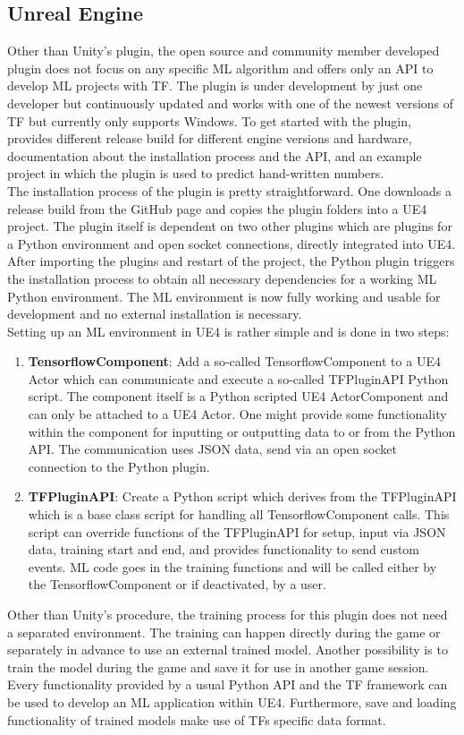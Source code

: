 \documentclass[MGS,Master,english]{twbook}%
\begin{document}
\subsection{Unreal Engine}
Other than Unity’s plugin, the open source and community member developed plugin does not focus on any specific ML algorithm and offers only an API to develop ML projects with \ac{TF}. The plugin is under development by just one developer but continuously updated and works with one of the newest versions of \ac{TF} but currently only supports Windows. To get started with the plugin, \citep{ue4::tensorFlowPlugin} provides different release build for different engine versions and hardware, documentation about the installation process and the API, and an example project in which the plugin is used to predict hand-written numbers.\\
The installation process of the plugin is pretty straightforward. One downloads a release build from the GitHub page and copies the plugin folders into a \ac{UE4} project. The plugin itself is dependent on two other plugins which are plugins for a Python environment and open socket connections, directly integrated into UE4. After importing the plugins and restart of the project, the Python plugin triggers the installation process to obtain all necessary dependencies for a working ML Python environment. The ML environment is now fully working and usable for development and no external installation is necessary.\\
Setting up an ML environment in UE4 is rather simple and is done in two steps:
\begin{enumerate}
	\item \textbf{TensorflowComponent}: Add a so-called TensorflowComponent to a UE4 Actor which can communicate and execute a so-called TFPluginAPI Python script. The component itself is a Python scripted UE4 ActorComponent and can only be attached to a UE4 Actor. One might provide some functionality within the component for inputting or outputting data to or from the Python API. The communication uses JSON data, send via an open socket connection to the Python plugin.
	\item \textbf{TFPluginAPI}: Create a Python script which derives from the TFPluginAPI which is a base class script for handling all TensorflowComponent calls. This script can override functions of the TFPluginAPI for setup, input via JSON data, training start and end, and provides functionality to send custom events. ML code goes in the training functions and will be called either by the TensorflowComponent or if deactivated, by a user.
\end{enumerate}
Other than Unity’s procedure, the training process for this plugin does not need a separated environment. The training can happen directly during the game or separately in advance to use an external trained model. Another possibility is to train the model during the game and save it for use in another game session. Every functionality provided by a usual Python API and the \ac{TF} framework can be used to develop an ML application within UE4. Furthermore, save and loading functionality of trained models make use of \acp{TF} specific data format.
\end{document}
